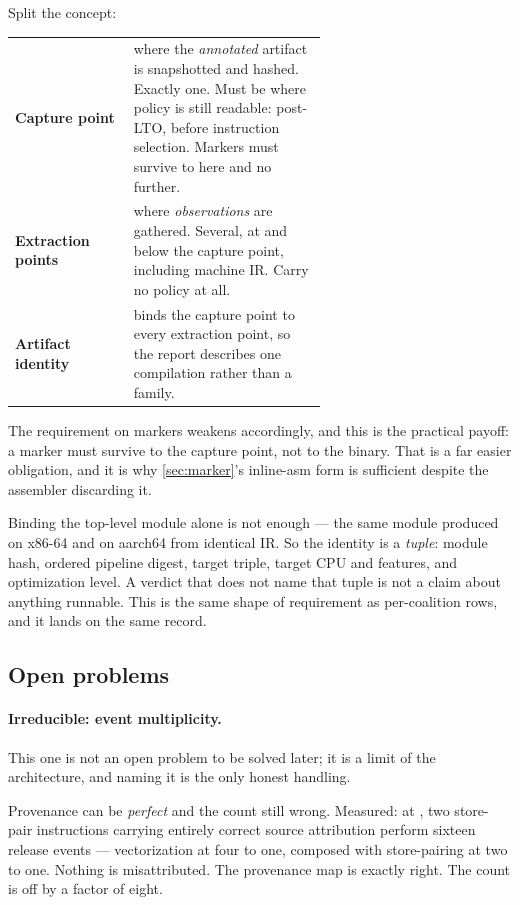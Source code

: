 Split the concept:

\begin{center}
\begin{tabular}{@{}l p{0.62\linewidth}@{}}
\toprule
\textbf{Capture point} & where the \emph{annotated} artifact is snapshotted and
hashed. Exactly one. Must be where policy is still readable: post-LTO, before
instruction selection. Markers must survive to here and no further. \\[3pt]
\textbf{Extraction points} & where \emph{observations} are gathered. Several, at
and below the capture point, including machine IR. Carry no policy at all. \\[3pt]
\textbf{Artifact identity} & binds the capture point to every extraction point,
so the report describes one compilation rather than a family. \\
\bottomrule
\end{tabular}
\end{center}

The requirement on markers weakens accordingly, and this is the practical
payoff: a marker must survive to the capture point, not to the binary. That is a
far easier obligation, and it is why \cref{sec:marker}'s inline-asm form is
sufficient despite the assembler discarding it.

\begin{remark}
Binding the top-level module alone is not enough --- the same module produced
 on x86-64 and  on aarch64 from identical IR. So the identity
is a \emph{tuple}: module hash, ordered pipeline digest, target triple, target
CPU and features, and optimization level. A verdict that does not name that tuple
is not a claim about anything runnable. This is the same shape of requirement as
per-coalition rows, and it lands on the same record.
\end{remark}

\subsection{Open problems}

\paragraph{Irreducible: event multiplicity.} This one is not an open problem to
be solved later; it is a limit of the architecture, and naming it is the only
honest handling.

Provenance can be \emph{perfect} and the count still wrong. Measured: at
, two  store-pair instructions carrying entirely correct
source attribution perform sixteen release events --- vectorization at four to
one, composed with store-pairing at two to one. Nothing is misattributed. The
provenance map is exactly right. The count is off by a factor of eight.

